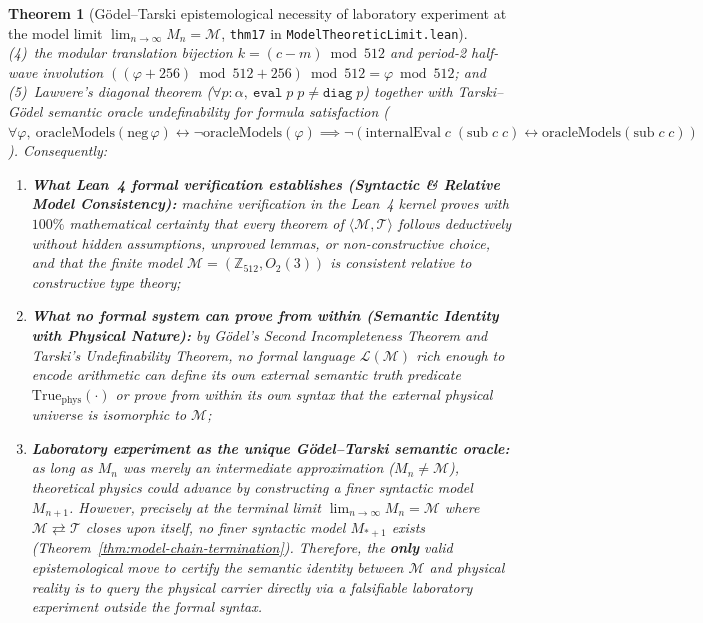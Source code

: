 \documentclass[11pt,a4paper]{article}
\newtheorem{theorem}{Theorem}[section]
\theoremstyle{definition}
\theoremstyle{remark}
\begin{document}
\begin{theorem}[G\"odel--Tarski epistemological necessity of laboratory experiment at the model limit $\lim_{n\to\infty} M_n = \mathcal{M}$, \texttt{thm17} in \texttt{ModelTheoreticLimit.lean}]
(4)~the modular translation bijection $k = (c-m)\bmod 512$ and period-2 half-wave involution $((\varphi+256)\bmod 512 + 256)\bmod 512 = \varphi\bmod 512$; and
(5)~Lawvere's diagonal theorem ($\forall p : \alpha,\ \texttt{eval}\;p\;p \ne \texttt{diag}\;p$) together with Tarski--G\"odel semantic oracle undefinability for formula satisfaction ($\forall\varphi,\ \mathrm{oracleModels}(\mathrm{neg}\,\varphi)\leftrightarrow\neg\mathrm{oracleModels}(\varphi)\implies\neg(\mathrm{internalEval}\;c\;(\mathrm{sub}\;c\;c)\leftrightarrow\mathrm{oracleModels}(\mathrm{sub}\;c\;c))$). Consequently:
\begin{enumerate}[label=\textbf{(\roman*)},leftmargin=*]
\item \textbf{What Lean~4 formal verification establishes (Syntactic \& Relative Model Consistency):}
  machine verification in the Lean~4 kernel proves with $100\%$ mathematical certainty that every theorem of $\langle\mathcal{M},\mathcal{T}\rangle$ follows deductively without hidden assumptions, unproved lemmas, or non-constructive choice, and that the finite model $\mathcal{M} = (\mathbb{Z}_{512}, O_2(3))$ is consistent relative to constructive type theory;
\item \textbf{What no formal system can prove from within (Semantic Identity with Physical Nature):}
  by G\"odel's Second Incompleteness Theorem and Tarski's Undefinability Theorem, no formal language $\mathcal{L}(\mathcal{M})$ rich enough to encode arithmetic can define its own external semantic truth predicate $\mathrm{True}_{\mathrm{phys}}(\cdot)$ or prove from within its own syntax that the external physical universe is isomorphic to $\mathcal{M}$;
\item \textbf{Laboratory experiment as the unique G\"odel--Tarski semantic oracle:}
  as long as $M_n$ was merely an intermediate approximation ($M_n \ne \mathcal{M}$), theoretical physics could advance by constructing a finer syntactic model $M_{n+1}$. However, precisely at the terminal limit $\lim_{n\to\infty} M_n = \mathcal{M}$ where $\mathcal{M}\rightleftarrows\mathcal{T}$ closes upon itself, no finer syntactic model $M_{*+1}$ exists (Theorem~\ref{thm:model-chain-termination}). Therefore, the \textbf{only} valid epistemological move to certify the semantic identity between $\mathcal{M}$ and physical reality is to query the physical carrier directly via a falsifiable laboratory experiment outside the formal syntax.
\end{enumerate}
\end{theorem}
\end{document}
